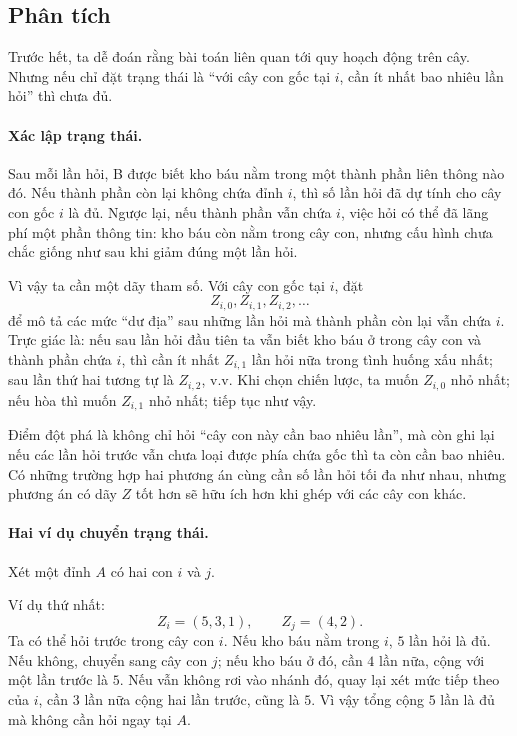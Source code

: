 \documentclass[11pt]{article}
\begin{document}
\subsection{Phân tích}

Trước hết, ta dễ đoán rằng bài toán liên quan tới quy hoạch động trên cây.
Nhưng nếu chỉ đặt trạng thái là ``với cây con gốc tại \(i\), cần ít nhất bao
nhiêu lần hỏi'' thì chưa đủ.

\paragraph{Xác lập trạng thái.}
Sau mỗi lần hỏi, B được biết kho báu nằm trong một thành phần liên thông nào
đó. Nếu thành phần còn lại không chứa đỉnh \(i\), thì số lần hỏi đã dự tính
cho cây con gốc \(i\) là đủ. Ngược lại, nếu thành phần vẫn chứa \(i\), việc
hỏi có thể đã lãng phí một phần thông tin: kho báu còn nằm trong cây con,
nhưng cấu hình chưa chắc giống như sau khi giảm đúng một lần hỏi.

Vì vậy ta cần một dãy tham số. Với cây con gốc tại \(i\), đặt
\[
  Z_{i,0},Z_{i,1},Z_{i,2},\ldots
\]
để mô tả các mức ``dư địa'' sau những lần hỏi mà thành phần còn lại vẫn chứa
\(i\). Trực giác là: nếu sau lần hỏi đầu tiên ta vẫn biết kho báu ở trong cây
con và thành phần chứa \(i\), thì cần ít nhất \(Z_{i,1}\) lần hỏi nữa trong
tình huống xấu nhất; sau lần thứ hai tương tự là \(Z_{i,2}\), v.v. Khi chọn
chiến lược, ta muốn \(Z_{i,0}\) nhỏ nhất; nếu hòa thì muốn \(Z_{i,1}\) nhỏ
nhất; tiếp tục như vậy.

Điểm đột phá là không chỉ hỏi ``cây con này cần bao nhiêu lần'', mà còn ghi
lại nếu các lần hỏi trước vẫn chưa loại được phía chứa gốc thì ta còn cần bao
nhiêu. Có những trường hợp hai phương án cùng cần số lần hỏi tối đa như nhau,
nhưng phương án có dãy \(Z\) tốt hơn sẽ hữu ích hơn khi ghép với các cây con
khác.

\paragraph{Hai ví dụ chuyển trạng thái.}
Xét một đỉnh \(A\) có hai con \(i\) và \(j\).

Ví dụ thứ nhất:
\[
  Z_i=(5,3,1),\qquad Z_j=(4,2).
\]
Ta có thể hỏi trước trong cây con \(i\). Nếu kho báu nằm trong \(i\), \(5\)
lần hỏi là đủ. Nếu không, chuyển sang cây con \(j\); nếu kho báu ở đó, cần
\(4\) lần nữa, cộng với một lần trước là \(5\). Nếu vẫn không rơi vào nhánh
đó, quay lại xét mức tiếp theo của \(i\), cần \(3\) lần nữa cộng hai lần
trước, cũng là \(5\). Vì vậy tổng cộng \(5\) lần là đủ mà không cần hỏi ngay
tại \(A\).
\end{document}

